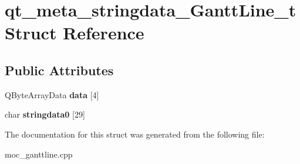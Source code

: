 \hypertarget{structqt__meta__stringdata___gantt_line__t}{}\section{qt\+\_\+meta\+\_\+stringdata\+\_\+\+Gantt\+Line\+\_\+t Struct Reference}
\label{structqt__meta__stringdata___gantt_line__t}
\subsection*{Public Attributes}
\begin{DoxyCompactItemize}
\item 
\hypertarget{structqt__meta__stringdata___gantt_line__t_ae0a5d1655913c2dbadc51f0f5c2b0304}{}Q\+Byte\+Array\+Data {\bfseries data} \mbox{[}4\mbox{]}\label{structqt__meta__stringdata___gantt_line__t_ae0a5d1655913c2dbadc51f0f5c2b0304}

\item 
\hypertarget{structqt__meta__stringdata___gantt_line__t_aa375e7dd8d0e003680101fdca1f8492d}{}char {\bfseries stringdata0} \mbox{[}29\mbox{]}\label{structqt__meta__stringdata___gantt_line__t_aa375e7dd8d0e003680101fdca1f8492d}

\end{DoxyCompactItemize}


The documentation for this struct was generated from the following file\+:\begin{DoxyCompactItemize}
\item 
moc\+\_\+ganttline.\+cpp\end{DoxyCompactItemize}
